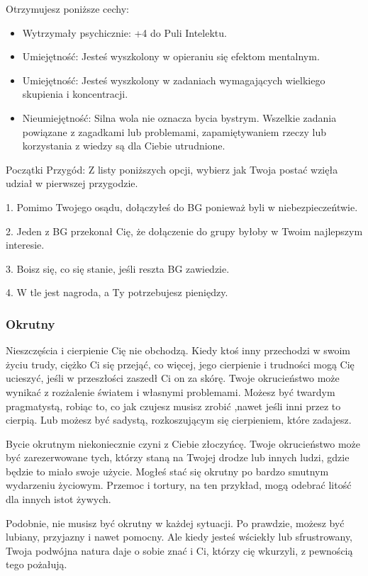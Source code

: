 Otrzymujesz poniższe cechy:
\begin{itemize}
    \item  Wytrzymały psychicznie: +4 do Puli Intelektu.
    \item  Umiejętność: Jesteś wyszkolony w opieraniu się efektom mentalnym.
    \item  Umiejętność: Jesteś wyszkolony w zadaniach wymagających wielkiego skupienia i koncentracji.
    \item  Nieumiejętność: Silna wola nie oznacza bycia bystrym. Wszelkie zadania powiązane z zagadkami lub problemami, zapamiętywaniem rzeczy lub korzystania z wiedzy są dla Ciebie utrudnione. 
\end{itemize}

Początki Przygód: Z listy poniższych opcji, wybierz jak Twoja postać wzięła udział w pierwszej przygodzie.

1. Pomimo Twojego osądu, dołączyłeś do BG ponieważ byli w niebezpieczeńtwie.

2. Jeden z BG przekonał Cię, że dołączenie do grupy byłoby w Twoim najlepszym interesie.

3. Boisz się, co się stanie, jeśli reszta BG zawiedzie.

4. W tle jest nagroda, a Ty potrzebujesz pieniędzy.

\subsubsection{Okrutny}

Nieszczęścia i cierpienie Cię nie obchodzą. Kiedy ktoś inny przechodzi w swoim życiu trudy, ciężko Ci się przejąć, co więcej, jego cierpienie i trudności mogą Cię ucieszyć, jeśli w przeszłości zaszedł Ci on za skórę. Twoje okrucieństwo może wynikać z rozżalenie światem i własnymi problemami. Możesz być twardym pragmatystą, robiąc to, co jak czujesz musisz zrobić ,nawet jeśli inni przez to cierpią. Lub możesz być sadystą, rozkoszującym się cierpieniem, które zadajesz. 

Bycie okrutnym niekoniecznie czyni z Ciebie złoczyńcę. Twoje okrucieństwo może być zarezerwowane tych, którzy staną na Twojej drodze lub innych ludzi, gdzie będzie to miało swoje użycie. Mogłeś stać się okrutny po bardzo smutnym wydarzeniu życiowym. Przemoc i tortury, na ten przykład, mogą odebrać litość dla innych istot żywych.

Podobnie, nie musisz być okrutny w każdej sytuacji. Po prawdzie, możesz być lubiany, przyjazny i nawet pomocny. Ale kiedy jesteś wściekły lub sfrustrowany, Twoja podwójna natura daje o sobie znać i Ci, którzy cię wkurzyli, z pewnością tego pożałują.

